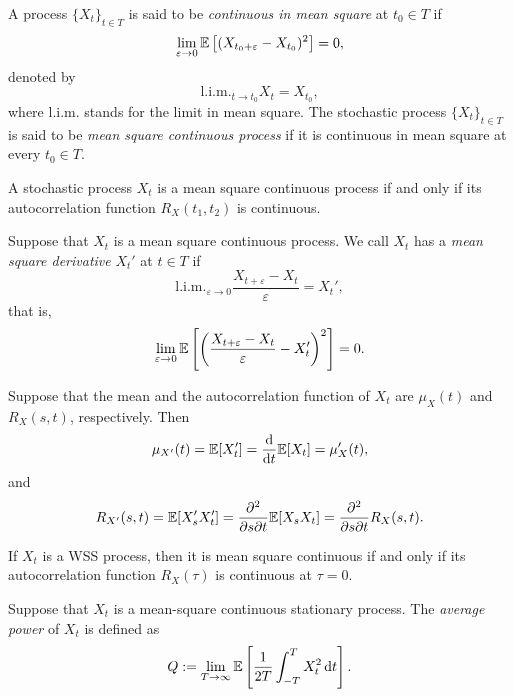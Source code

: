 \begin{definition}
  A process \(\{X_t\}_{t \in T}\) is said to be \emph{continuous in mean square} at \(t_0 \in T\) if
  \[
    \lim_{\varepsilon \to 0} \mathbb{E}\left[(X_{t_0 + \varepsilon} - X_{t_0})^2\right] = 0,
  \]
  denoted by
  \[
    \mathrm{l.i.m.}_{t \to t_0} X_t = X_{t_0},
  \]
  where \(\mathrm{l.i.m.}\) stands for the limit in mean square. The stochastic process \(\{X_t\}_{t \in T}\) is said to be \emph{mean square continuous process} if it is continuous in mean square at every \(t_0 \in T\).
\end{definition}

\begin{theorem}
  A stochastic process \(X_t\) is a mean square continuous process if and only if its autocorrelation function \(R_X(t_1, t_2)\) is continuous.
\end{theorem}

\begin{definition}
  Suppose that \(X_t\) is a mean square continuous process. We call \(X_t\) has a \emph{mean square derivative} \(X_t'\) at \(t \in T\) if
  \[
    \mathrm{l.i.m.}_{\varepsilon \to 0} \frac{X_{t + \varepsilon} - X_t}{\varepsilon} = X_t',
  \]
  that is,
  \[
    \lim_{\varepsilon \to 0} \mathbb{E}\left[\left(\frac{X_{t + \varepsilon} - X_t}{\varepsilon} - X_t'\right)^2\right] = 0.
  \]
\end{definition}

\begin{theorem}
  Suppose that the mean and the autocorrelation function of \(X_t\) are \(\mu_X(t)\) and \(R_X(s, t)\), respectively. Then
  \[
    \mu_{X'}(t) = \mathbb{E}[X_t'] = \frac{\mathrm{d}}{\mathrm{d} t} \mathbb{E}[X_t] = \mu_X'(t),
  \]
  and
  \[
    R_{X'}(s, t) = \mathbb{E}[X_s' X_t'] = \frac{\partial^2}{\partial s \partial t} \mathbb{E}[X_s X_t] = \frac{\partial^2}{\partial s \partial t} R_X(s, t).
  \]
\end{theorem}

\begin{theorem}
  If \(X_t\) is a WSS process, then it is mean square continuous if and only if its autocorrelation function \(R_X(\tau)\) is continuous at \(\tau = 0\).
\end{theorem}

\begin{definition}
  Suppose that \(X_t\) is a mean-square continuous stationary process. The \emph{average power} of \(X_t\) is defined as
  \[
    Q := \lim_{T \to \infty} \mathbb{E} \left[\frac{1}{2T} \int_{-T}^T X_t^2 \, \mathrm{d} t\right].
  \]
\end{definition}

